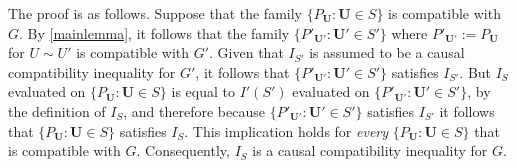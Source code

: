 The proof is as follows.  Suppose that the family $\{ P_{\bm{U}} : \bm{U} \in S\}$ is compatible with $G$.  By \cref{mainlemma}, it follows that the family $ \{ P'_{\bm{U}'} : \bm{U}' \in S'\}$ where $P'_{\bm{U}'}:= P_{\bm{U}}$ for $U \sim U'$  is compatible with $G'$.  Given that $I_{S'}$ is assumed to be a causal compatibility inequality for $G'$, it follows that $\{ P'_{\bm{U}'} : \bm{U}' \in S'\}$ satisfies $I_{S'}$.  But $I_{S}$ evaluated on $\{ P_{\bm{U}} : \bm{U} \in S\}$ is equal to $I'(S')$ evaluated on $\{ P'_{\bm{U}'} : \bm{U}' \in S'\}$, by the definition of $I_{S}$, and therefore because $\{ P'_{\bm{U}'} : \bm{U}' \in S'\}$ satisfies $I_{S'}$ it follows that $\{ P_{\bm{U}} : \bm{U} \in S\}$ satisfies $I_{S}$.  This implication holds for {\em every} $\{ P_{\bm{U}} : \bm{U} \in S\}$ that is compatible with $G$.  Consequently, $I_{S}$ is a causal compatibility inequality for $G$.  






